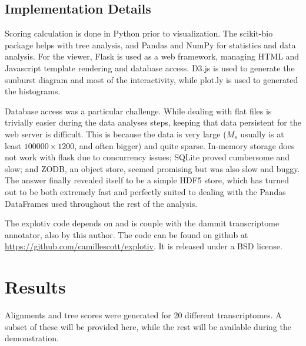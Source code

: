 \documentclass[12pt]{article} %
\begin{document}
\subsection{Implementation Details}

Scoring calculation is done in Python prior to visualization. The scikit-bio package helps with tree analysis, and Pandas
\cite{mckinney_data_2010} and NumPy for statistics and data analysis. For the viewer, Flask is used as a web framework,
managing HTML and Javascript template rendering and database access. D3.js \cite{bostock_d3:_2011} 
is used to generate the sunburst diagram and most of the interactivity, while plot.ly is used to generated the histograms.

Database access was a particular challenge. While dealing with flat files is trivially easier during the data analyses steps,
keeping that data persistent for the web server is difficult. This is because the data is very large ($M_s$ usually is at least
$100000 \times 1200$, and often bigger) and quite sparse. In-memory storage does not work with flask due to concurrency
issues; SQLite proved cumbersome and slow; and ZODB, an object store, seemed promising but was also slow and buggy.
The answer finally revealed itself to be a simple HDF5 store, which has turned out to be both extremely fast and perfectly
suited to dealing with the Pandas DataFrames used throughout the rest of the analysis.

The explotiv code depends on and is couple with the dammit transcriptome annotator, also by this author. The code can be found
on github at \url{https://github.com/camillescott/explotiv}. It is released under a BSD license. 


\section{Results}

Alignments and tree scores were generated for 20 different transcriptomes. A subset of these will be provided here, while the rest
will be available during the demonstration. 
\end{document}
